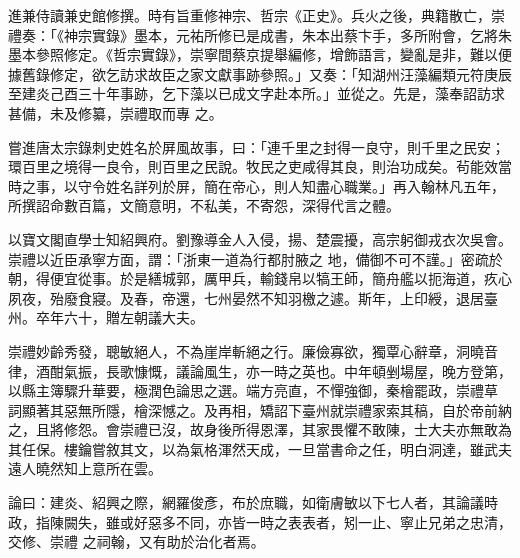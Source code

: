\begin{pinyinscope}
 進兼侍讀兼史館修撰。時有旨重修神宗、哲宗《正史》。兵火之後，典籍散亡，崇禮奏：「《神宗實錄》墨本，元祐所修已是成書，朱本出蔡卞手，多所附會，乞將朱墨本參照修定。《哲宗實錄》，崇寧間蔡京提舉編修，增飾語言，變亂是非，難以便據舊錄修定，欲乞訪求故臣之家文獻事跡參照。」又奏：「知湖州汪藻編類元符庚辰至建炎己酉三十年事跡，乞下藻以已成文字赴本所。」並從之。先是，藻奉詔訪求甚備，未及修纂，崇禮取而專
 之。



 嘗進唐太宗錄刺史姓名於屏風故事，曰：「連千里之封得一良守，則千里之民安；環百里之境得一良令，則百里之民說。牧民之吏咸得其良，則治功成矣。茍能效當時之事，以守令姓名詳列於屏，簡在帝心，則人知盡心職業。」再入翰林凡五年，所撰詔命數百篇，文簡意明，不私美，不寄怨，深得代言之體。



 以寶文閣直學士知紹興府。劉豫導金人入侵，揚、楚震擾，高宗躬御戎衣次吳會。崇禮以近臣承寧方面，謂：「浙東一道為行都肘腋之
 地，備御不可不謹。」密疏於朝，得便宜從事。於是繕城郭，厲甲兵，輸錢帛以犒王師，簡舟艦以扼海道，疚心夙夜，殆廢食寢。及春，帝還，七州晏然不知羽檄之遽。斯年，上印綬，退居臺州。卒年六十，贈左朝議大夫。



 崇禮妙齡秀發，聰敏絕人，不為崖岸斬絕之行。廉儉寡欲，獨覃心辭章，洞曉音律，酒酣氣振，長歌慷慨，議論風生，亦一時之英也。中年頓剉場屋，晚方登第，以縣主簿驟升華要，極潤色論思之選。端方亮直，不憚強御，秦檜罷政，崇禮草
 詞顯著其惡無所隱，檜深憾之。及再相，矯詔下臺州就崇禮家索其稿，自於帝前納之，且將修怨。會崇禮已沒，故身後所得恩澤，其家畏懼不敢陳，士大夫亦無敢為其任保。樓鑰嘗敘其文，以為氣格渾然天成，一旦當書命之任，明白洞達，雖武夫遠人曉然知上意所在雲。



 論曰：建炎、紹興之際，網羅俊彥，布於庶職，如衛膚敏以下七人者，其論議時政，指陳闕失，雖或好惡多不同，亦皆一時之表表者，矧一止、寧止兄弟之忠清，交修、崇禮
 之祠翰，又有助於治化者焉。



\end{pinyinscope}
